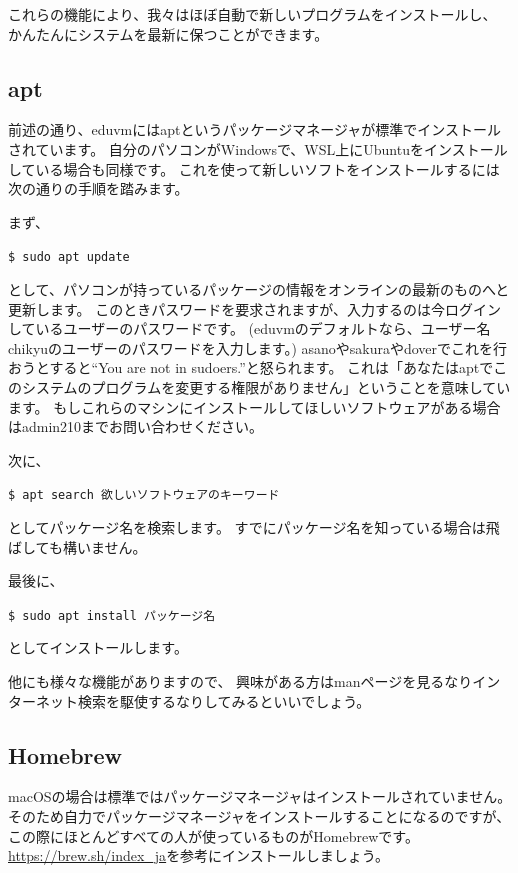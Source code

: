 \documentclass[a4j]{ltjreport}
\begin{document}
    これらの機能により、我々はほぼ自動で新しいプログラムをインストールし、
    かんたんにシステムを最新に保つことができます。

    \subsection{apt}
    前述の通り、eduvmにはaptというパッケージマネージャが標準でインストールされています。
    自分のパソコンがWindowsで、WSL上にUbuntuをインストールしている場合も同様です。
    これを使って新しいソフトをインストールするには次の通りの手順を踏みます。

    まず、
    \begin{screen}
        \texttt{\$ sudo apt update}
    \end{screen}
    として、パソコンが持っているパッケージの情報をオンラインの最新のものへと更新します。
    このときパスワードを要求されますが、入力するのは今ログインしているユーザーのパスワードです。
    (eduvmのデフォルトなら、ユーザー名chikyuのユーザーのパスワードを入力します。)
    asanoやsakuraやdoverでこれを行おうとすると``You are not in sudoers.''と怒られます。
    これは「あなたはaptでこのシステムのプログラムを変更する権限がありません」ということを意味しています。
    もしこれらのマシンにインストールしてほしいソフトウェアがある場合はadmin210までお問い合わせください。

    次に、
    \begin{screen}
        \texttt{\$ apt search 欲しいソフトウェアのキーワード}
    \end{screen}
    としてパッケージ名を検索します。
    すでにパッケージ名を知っている場合は飛ばしても構いません。

    最後に、
    \begin{screen}
        \texttt{\$ sudo apt install パッケージ名}
    \end{screen}
    としてインストールします。

    他にも様々な機能がありますので、
    興味がある方はmanページを見るなりインターネット検索を駆使するなりしてみるといいでしょう。

    \subsection{Homebrew}
    macOSの場合は標準ではパッケージマネージャはインストールされていません。
    そのため自力でパッケージマネージャをインストールすることになるのですが、
    この際にほとんどすべての人が使っているものがHomebrewです。
    \url{https://brew.sh/index_ja}を参考にインストールしましょう。
\end{document}
